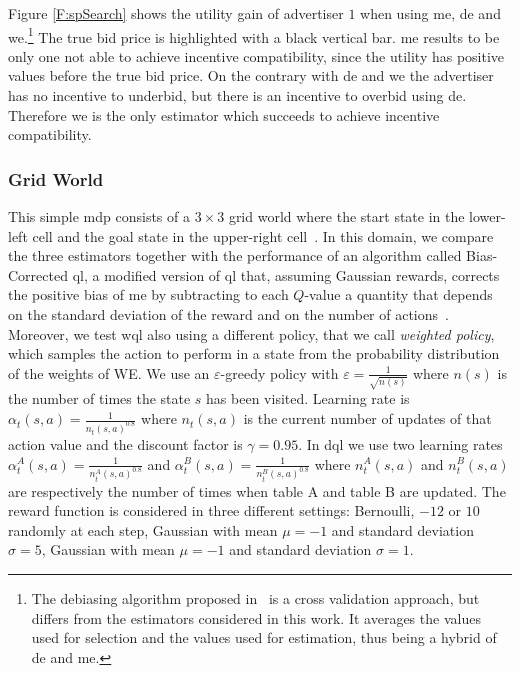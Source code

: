 Figure \ref{F:spSearch} shows the utility gain of advertiser $1$ when using \gls{me}, \gls{de} and \gls{we}.\footnote{The debiasing algorithm proposed in~\cite{xu2013mab} is a cross validation approach, but differs from the estimators considered in this work. It averages the values used for selection and the values used for estimation, thus being a hybrid of \gls{de} and \gls{me}.}
The true bid price is highlighted with a black vertical bar. \gls{me} results to be only one not able to achieve incentive compatibility, since the utility has positive values before the true bid price. On the contrary with \gls{de} and \gls{we} the advertiser has no incentive to underbid, but there is an incentive to overbid using \gls{de}. Therefore \gls{we} is the only estimator which succeeds to achieve incentive compatibility.

\subsubsection{Grid World}
This simple \gls{mdp} consists of a $3 \times 3$ grid world where the start state in the lower-left cell and the goal state in the upper-right cell~\cite{van2010double}. 
In this domain, we compare the three estimators together with the performance of an algorithm called Bias-Corrected \gls{ql}, a modified version of \gls{ql} that, assuming Gaussian rewards, corrects the positive bias of \gls{me} by subtracting to each $Q$-value a quantity that depends on the standard deviation of the reward and on the number of actions~\cite{lee2012intelligent,lee2013bias}. Moreover, we test \gls{wql} also using a different policy, that we call \textit{weighted policy}, which samples the action to perform in a state from the probability distribution of the weights of WE.
We use an $\varepsilon$-greedy policy with $\varepsilon = \frac{1}{\sqrt{n(s)}}$ where $n(s)$ is the number of times the state $s$ has been visited.
Learning rate is $\alpha_t(s, a) = \frac{1}{n_t(s, a)^{0.8}}$ where $n_t(s, a)$ is the current number of updates of that action value and the discount factor is $\gamma = 0.95$. 
In \gls{dql} we use two learning rates $\alpha_t^A(s, a) = \frac{1}{n_t^A(s, a)^{0.8}}$ and $\alpha_t^B(s, a) = \frac{1}{n_t^B(s, a)^{0.8}}$ where $n_t^A(s, a)$ and $n_t^B(s, a)$ are respectively the number of times when table A and table B are updated. 
The reward function is considered in three different settings: Bernoulli, $-12$ or $10$ randomly at each step, Gaussian with mean $\mu = -1$ and standard deviation $\sigma = 5$, Gaussian with mean $\mu = -1$ and standard deviation $\sigma = 1$. 

